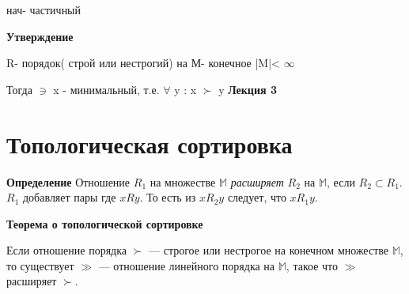 \documentclass{article}
\begin{document}
нач- частичный

\textbf{Утверждение}

R- порядок( строй или нестрогий) на М- конечное |M|< $\infty$

Тогда $\ni$ x - минимальный, т.е. $\forall$ y : x $\succ$ y
    \textbf{Лекция 3}
    	\section{Топологическая сортировка}
    	\textbf{Определение}
	    Отношение $R_1$ на множестве $\mathbb{M}$ \textit{расширяет} $R_2$ на $\mathbb{M}$, если $R_2 \subset R_1$.
		$R_1$ добавляет пары где $xRy$. То есть из $xR_2y$ следует, что $xR_1y$.
	
	    \textbf{Теорема о топологической сортировке}
	
		Если отношение порядка $\succ$ --- строгое или нестрогое на конечном множестве $\mathbb{M}$, то существует $\gg$ --- отношение линейного порядка на $\mathbb{M}$, такое что $\gg$ расширяет $\succ$.
	\usetikzlibrary{shapes.geometric}
\end{document}
